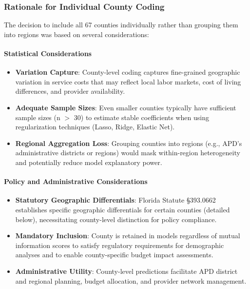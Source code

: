 \subsubsection{Rationale for Individual County Coding}

The decision to include all 67 counties individually rather than grouping them into regions was based on several considerations:

\paragraph{Statistical Considerations}
\begin{itemize}
    \item \textbf{Variation Capture}: County-level coding captures fine-grained geographic variation in service costs that may reflect local labor markets, cost of living differences, and provider availability.
    
    \item \textbf{Adequate Sample Sizes}: Even smaller counties typically have sufficient sample sizes (n $>$ 30) to estimate stable coefficients when using regularization techniques (Lasso, Ridge, Elastic Net).
    
    \item \textbf{Regional Aggregation Loss}: Grouping counties into regions (e.g., APD's administrative districts or regions) would mask within-region heterogeneity and potentially reduce model explanatory power.
\end{itemize}

\paragraph{Policy and Administrative Considerations}
\begin{itemize}
    \item \textbf{Statutory Geographic Differentials}: Florida Statute §393.0662 establishes specific geographic differentials for certain counties (detailed below), necessitating county-level distinction for policy compliance.
    
    \item \textbf{Mandatory Inclusion}: County is retained in models regardless of mutual information scores to satisfy regulatory requirements for demographic analyses and to enable county-specific budget impact assessments.
    
    \item \textbf{Administrative Utility}: County-level predictions facilitate APD district and regional planning, budget allocation, and provider network management.
\end{itemize}

